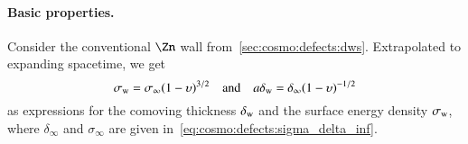 
    \paragraph{Basic properties.} %

    Consider the conventional $\Zn$ wall from~\cref{sec:cosmo:defects:dws}. Extrapolated to expanding spacetime, we get
    \begin{equation}\label{eq:PT:symm_dws:surface_tension_and_thickness_FLRW}
         \sigma\ped{w} = \sigma_\infty \pclosed{1-\upsilon}^{3/2} %
         \quad \text{and} \quad  %
         a\delta\ped{w} = \delta_\infty \pclosed{1-\upsilon}^{-1/2}
    \end{equation}
    as expressions for the comoving thickness $\delta_\mathrm{w}$ and the surface energy density $\sigma_\mathrm{w}$, where $\delta_\infty$ and $\sigma_\infty$ are given in~\cref{eq:cosmo:defects:sigma_delta_inf}.

